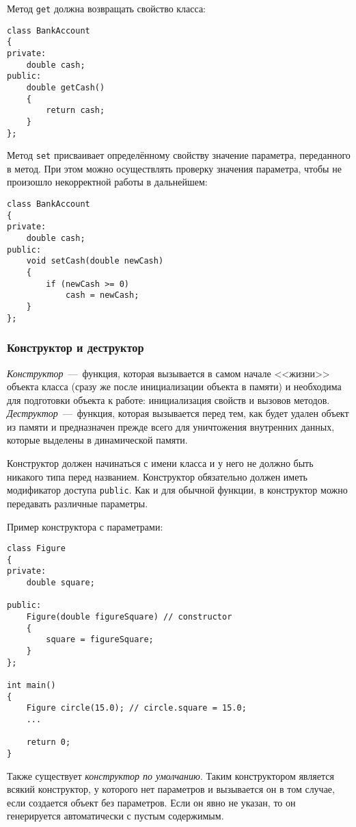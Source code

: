 Метод \lstinline|get| должна возвращать свойство класса:

\begin{lstlisting}
class BankAccount
{
private:
    double cash;
public:
    double getCash()
    {
        return cash;
    }
};
\end{lstlisting}

Метод \lstinline|set| присваивает определённому свойству значение параметра, переданного в метод. При этом можно осуществлять проверку значения параметра, чтобы не произошло некорректной работы в дальнейшем:

\begin{lstlisting}
class BankAccount
{
private:
    double cash;
public:
    void setCash(double newCash)
    {
        if (newCash >= 0)
            cash = newCash;
    }
};
\end{lstlisting}

\subsubsection{Конструктор и деструктор}
\label{subsubsec:ContstructorDestructor}
\emph{Конструктор}~---~функция, которая вызывается в самом начале <<жизни>> объекта класса (сразу же после инициализации объекта в памяти) и необходима для подготовки объекта к работе: инициализация свойств и вызовов методов. \emph{Деструктор}~---~функция, которая вызывается перед тем, как будет удален объект из памяти и предназначен прежде всего для уничтожения внутренних данных, которые выделены в динамической памяти.

Конструктор должен начинаться с имени класса и у него не должно быть никакого типа перед названием. Конструктор обязательно должен иметь модификатор доступа \lstinline|public|. Как и для обычной функции, в конструктор можно передавать различные параметры.

Пример конструктора с параметрами:

\begin{lstlisting}
class Figure
{
private:
    double square;

public:
    Figure(double figureSquare) // constructor
    {
        square = figureSquare;
    }
};

int main()
{
    Figure circle(15.0); // circle.square = 15.0;
    ...
    
    return 0;
}
\end{lstlisting} 

Также существует \emph{конструктор по умолчанию}. Таким конструктором является всякий конструктор, у которого нет параметров и вызывается он в том случае, если создается объект без параметров. Если он явно не указан, то он генерируется автоматически с пустым содержимым.

